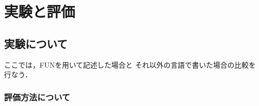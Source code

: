 \documentclass{funthesis}
\begin{document}
\chapter{実験と評価}

\section{実験について}

ここでは，FUNを用いて記述した場合と
それ以外の言語で書いた場合の比較を行なう．





\subsection{評価方法について}




\end{document}
